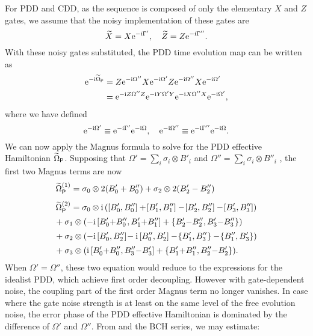 \documentclass[aps,pra,reprint,superscriptaddress]{revtex4-2}
\begin{document}
For PDD and CDD, as the sequence is composed of only the elementary $X$ and $Z$ gates, we assume that the noisy implementation of these gates are
\begin{equation}\label{eq:gatedep-noise}
\widetilde{X} = X \mathrm{e}^{-\mathrm{i} \Gamma'},
\quad \widetilde{Z} = Z \mathrm{e}^{-\mathrm{i} \Gamma''}.
\end{equation}
With these noisy gates substituted, the PDD time evolution map can be written as
\begin{equation}
\begin{split}
\mathrm{e}^{-\mathrm{i} \widetilde{\Omega}_{\mathsf{P}}} &= Z \mathrm{e}^{-\mathrm{i} \Omega''}   X \mathrm{e}^{-\mathrm{i} \Omega'} Z \mathrm{e}^{-\mathrm{i} \Omega''} X \mathrm{e}^{-\mathrm{i} \Omega'}  \\
& = \mathrm{e}^{-\mathrm{i} Z\Omega''Z} \mathrm{e}^{-\mathrm{i} Y\Omega'Y} \mathrm{e}^{-\mathrm{i} X\Omega''X} \mathrm{e}^{-\mathrm{i} \Omega'},
\end{split}
\end{equation}
where we have defined 
\begin{equation}\label{eq:Omega-gatedep}
\mathrm{e}^{-\mathrm{i} \Omega'}\equiv \mathrm{e}^{-\mathrm{i} \Gamma'}\mathrm{e}^{-\mathrm{i} \Omega},\quad 
\mathrm{e}^{-\mathrm{i} \Omega''}\equiv \mathrm{e}^{-\mathrm{i} \Gamma''}\mathrm{e}^{-\mathrm{i} \Omega}.
\end{equation}
We can now apply the Magnus formula  to solve for the PDD effective Hamiltonian 
$\widetilde{\Omega}_{\mathsf{P}}$. 
Supposing that $\Omega' = \sum_i \sigma_i \otimes B'_i$ and 
$\Omega'' = \sum_i \sigma_i \otimes B''_i$ , the first two Magnus terms are 
now
\begin{align}\label{eq:PDD-gatedep-Mag1}
&\widetilde{\Omega}_\sP^{(1)} 
= \sigma_0 \otimes 2(B'_0 + B''_0) + \sigma_2 \otimes 2(B_2'-B_2'') \\[1ex]
&\widetilde{\Omega}_\sP^{(2)} = \notag
\sigma_0 \otimes \upi\,([B'_0,B''_0]+\![B'_1,B''_1]-\![B'_2,B''_2]-\![B'_3,B''_3]) \\[0.5ex]
&\! + \sigma_1 \otimes 
(-\upi\,[B_0'{+}B_0'',B_1'{+}B_1'']+\{B_2'{-}B_2'', B_3'{-}B_3''\}) \notag \\[0.5ex]
 &\!+ \sigma_2 \otimes 
(-\upi\,[B_0',B_2'']\!-\upi\,[B_0'',B_2'] -\! \{B_1',B_3''\}
 -\!\{B_1'',B_3'\} ) \notag\\[0.5ex]
 &\!+\sigma_3 \otimes 
(\upi\,[B_0'{+}B_0'',B_3''{-}B_3'] + \{B_1'{+}B_1'',B_2''{-}B_2'\}).
\label{eq:PDD-gatedep-Mag2}
\end{align}
When $\Omega'=\Omega''$, these two equation would reduce to the expressions for the idealist PDD, which achieve first order decoupling.  However with gate-dependent noise, 
the coupling part of the first order Magnus term no longer vanishes. In case where the gate noise strength is at least on the same level of the free evolution noise, the error phase of the PDD effective Hamiltonian is  dominated by the difference of $\Omega'$ and $\Omega''$. From  and the BCH series, we may estimate:
\end{document}
